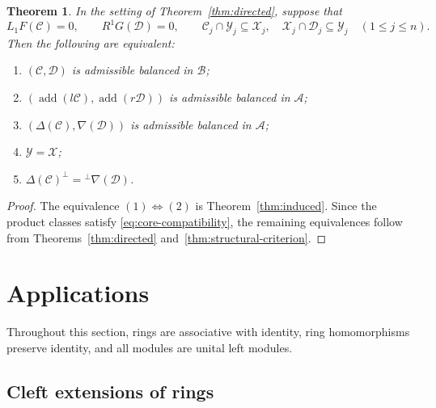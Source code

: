 \documentclass[11pt]{amsart}
\newtheorem{theorem}{Theorem}[section]
\theoremstyle{definition}
\theoremstyle{remark}
\theoremstyle{plain}
\numberwithin{equation}{section}
\begin{document}
\begin{theorem}\label{thm:three-levels}
In the setting of Theorem~\ref{thm:directed}, suppose that
\[
 L_1F(\mathcal{C}) = 0, \qquad R^1G(\mathcal{D}) = 0, \qquad
 \mathcal{C}_j \cap \mathcal{Y}_j \subseteq \mathcal{X}_j, \quad \mathcal{X}_j \cap \mathcal{D}_j \subseteq \mathcal{Y}_j
 \quad(1 \leq j \leq n).
\]
Then the following are equivalent:
\begin{enumerate}
 \item $(\mathcal{C}, \mathcal{D})$ is admissible balanced in $\mathcal{B}$;
 \item $(\operatorname{add}(l\mathcal{C}), \operatorname{add}(r\mathcal{D}))$ is admissible balanced in $\mathcal{A}$;
 \item $(\Delta(\mathcal{C}), \nabla(\mathcal{D}))$ is admissible balanced in
 $\mathcal{A}$;
 \item $\mathcal{Y} = \mathcal{X}$;
 \item $\Delta(\mathcal{C})^\perp = {}^\perp\nabla(\mathcal{D})$.
\end{enumerate}
\end{theorem}

\begin{proof}
The equivalence $(1) \Leftrightarrow (2)$ is Theorem~\ref{thm:induced}. Since the product classes satisfy
\eqref{eq:core-compatibility}, the remaining equivalences follow from
Theorems~\ref{thm:directed} and~\ref{thm:structural-criterion}.
\end{proof}



\section{Applications}\label{sec:applications}

Throughout this section, rings are associative with identity, ring homomorphisms preserve identity, and all modules are unital left modules.

\subsection{Cleft extensions of rings}\label{subsec:split}
\end{document}
